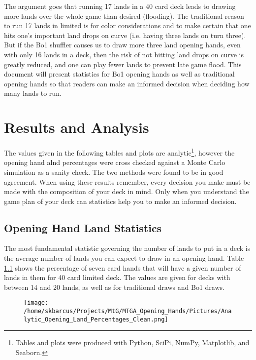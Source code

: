 \documentclass[oneside]{book}   %
\begin{document}
The argument goes that running 17 lands in a 40 card deck leads to drawing more lands over the whole game than desired (flooding). The traditional reason to run 17 lands in limited is for color considerations and to make certain that one hits one's important land drops on curve (i.e. having three lands on turn three). But if the Bo1 shuffler causes us to draw more three land opening hands, even with only 16 lands in a deck, then the risk of not hitting land drops on curve is greatly reduced, and one can play fewer lands to prevent late game flood. This document will present statistics for Bo1 opening hands as well as traditional opening hands so that readers can make an informed decision when deciding how many lands to run.

\chapter{Results and Analysis}
\label{results}

The values given in the following tables and plots are analytic\footnote{Tables and plots were produced with Python, SciPi, NumPy, Matplotlib, and Seaborn.}, however the opening hand alnd percentages were cross checked against a Monte Carlo simulation as a sanity check. The two methods were found to be in good agreement. When using these results remember, every decision you make must be made with the composition of your deck in mind. Only when you understand the game plan of your deck can statistics help you to make an informed decision.

\section{Opening Hand Land Statistics}
\label{opener}

The most fundamental statistic governing the number of lands to put in a deck is the average number of lands you can expect to draw in an opening hand. Table \ref{fig:opening_hand_percentages} shows the percentage of seven card hands that will have a given number of lands in them for 40 card limited deck. The values are given for decks with between 14 and 20 lands, as well as for traditional draws and Bo1 draws.  

	\begin{figure}[!ht]
	\centering
	\centerline{\texttt{[image: /home/skbarcus/Projects/MtG/MTGA\_Opening\_Hands/Pictures/Analytic\_Opening\_Land\_Percentages\_Clean.png]}}
	\label{fig:opening_hand_percentages}
	\end{figure}	
	
\end{document}
